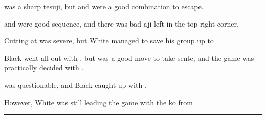 \documentclass[letterpaper,12pt]{memoir}
\begin{document}
\begin{minipage}[t]{268.19999999999993pt}
\setlength{\parskip}{0.5em}
{} was a sharp tesuji, but {} and {} were a good combination to escape.

{} and {} were good sequence, and there was bad aji left in the top right corner.

Cutting at {} was severe, but White managed to save his group up to {}.

Black went all out with {}, but {} was a good move to take sente, and the game was practically decided with {}.

{} was questionable, and Black caught up with {}.

However, White was still leading the game with the ko from {}.


\end{minipage}
\vfill

\rule{\textwidth}{0.5pt}
\end{document}
